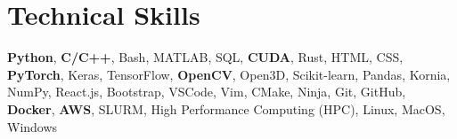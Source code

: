 \section{Technical Skills}

\setlength{\multicolsep}{-4pt}
\begin{multicols}{2}
	\raggedcolumns{}

	\resumeSubHeadingListStart{}
	{\textbf{Python}, 
	\textbf{C/C++}, 
	Bash, 
	MATLAB, 
	SQL, 
	\textbf{CUDA}, 
	Rust, 
	HTML, 
	CSS, 
	\textbf{PyTorch}, 
	Keras, 
	TensorFlow, 
	\textbf{OpenCV}, 
	Open3D, 
	Scikit-learn, 
	Pandas,
	Kornia,
	NumPy,
	React.js,
	Bootstrap,}
	{VSCode, 
	Vim, 
	CMake, 
	Ninja, 
	Git, 
	GitHub, 
	\textbf{Docker},
	\textbf{AWS},
	SLURM,
	High Performance Computing (HPC), 
	Linux, 
	MacOS, 
	Windows}
	\resumeSubHeadingListEnd{}

\end{multicols}
